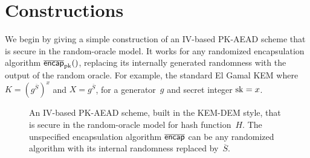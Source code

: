\section{Constructions}
\label{sec:constructions}
We begin by giving a simple construction of an IV-based PK-AEAD scheme that is secure in the random-oracle model. It works for any randomized encapsulation algorithm $\OLencapprim{\pk}{}$, replacing its internally generated randomness with the output of the random oracle.  For example, the standard El Gamal KEM where $K=\left(g^{\overline{S}}\right)^x$ and $X=g^{\overline{S}}$, for a generator~$g$ and secret integer $\mathrm{sk}=x$.
%


\begin{figure}
\begin{center}
\caption{An IV-based PK-AEAD scheme, built in the KEM-DEM style, that is secure in the random-oracle model for hash function~$H$. The unspecified encapsulation algorithm $\overline{\mathsf{encap}}$ can be any randomized algorithm with its internal randomness replaced by~$\overline{S}$.
}
\label{fig:ro-kem-dem-construction}
\end{center}
\end{figure}
